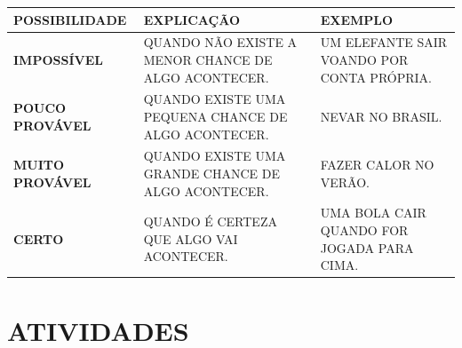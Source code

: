 

\begin{table}[H]
    \centering
    \begin{tabular}{|l|l|l|}
    \hline
        \textbf{POSSIBILIDADE} & \textbf{EXPLICAÇÃO} & \textbf{EXEMPLO} \\ \hline
        \textbf{IMPOSSÍVEL} & \parbox{4cm}{QUANDO NÃO EXISTE A MENOR CHANCE DE ALGO ACONTECER.} & \parbox{4cm}{UM ELEFANTE SAIR VOANDO POR CONTA PRÓPRIA.} \\ \hline
        \textbf{POUCO PROVÁVEL} & \parbox{4cm}{QUANDO EXISTE UMA PEQUENA CHANCE DE ALGO ACONTECER.} & \parbox{4cm}{NEVAR NO BRASIL.} \\ \hline
        \textbf{MUITO PROVÁVEL} & \parbox{4cm}{QUANDO EXISTE UMA GRANDE CHANCE DE ALGO ACONTECER.} & \parbox{4cm}{FAZER CALOR NO VERÃO.} \\ \hline
        \textbf{CERTO} & \parbox{4cm}{QUANDO É CERTEZA QUE ALGO VAI ACONTECER.} & \parbox{4cm}{UMA BOLA CAIR QUANDO FOR JOGADA PARA CIMA.} \\ \hline
    \end{tabular}
\end{table}


\section*{ATIVIDADES}

